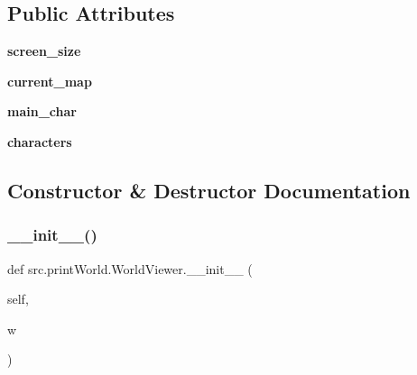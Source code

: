 \subsection*{Public Attributes}
\begin{DoxyCompactItemize}
\item 
\hypertarget{classsrc_1_1print_world_1_1_world_viewer_ae9f3c8aa9f4c6fa7266bf1938abf42d7}{}\label{classsrc_1_1print_world_1_1_world_viewer_ae9f3c8aa9f4c6fa7266bf1938abf42d7} 
{\bfseries screen\+\_\+size}
\item 
\hypertarget{classsrc_1_1print_world_1_1_world_viewer_abe280ed0dc28ea4ba79b31c8b635cce0}{}\label{classsrc_1_1print_world_1_1_world_viewer_abe280ed0dc28ea4ba79b31c8b635cce0} 
{\bfseries current\+\_\+map}
\item 
\hypertarget{classsrc_1_1print_world_1_1_world_viewer_a1fb3598723ae9082b1b0ecf97980634d}{}\label{classsrc_1_1print_world_1_1_world_viewer_a1fb3598723ae9082b1b0ecf97980634d} 
{\bfseries main\+\_\+char}
\item 
\hypertarget{classsrc_1_1print_world_1_1_world_viewer_aa32f61fefaabb55affe625facfe2697b}{}\label{classsrc_1_1print_world_1_1_world_viewer_aa32f61fefaabb55affe625facfe2697b} 
{\bfseries characters}
\end{DoxyCompactItemize}


\subsection{Constructor \& Destructor Documentation}
\hypertarget{classsrc_1_1print_world_1_1_world_viewer_a952dbc8118e5dfa003f6154426aff670}{}\label{classsrc_1_1print_world_1_1_world_viewer_a952dbc8118e5dfa003f6154426aff670} 
\subsubsection{\texorpdfstring{\+\_\+\+\_\+init\+\_\+\+\_\+()}{\_\_init\_\_()}}
{\footnotesize\ttfamily def src.\+print\+World.\+World\+Viewer.\+\_\+\+\_\+init\+\_\+\+\_\+ (\begin{DoxyParamCaption}\item[{}]{self,  }\item[{}]{w }\end{DoxyParamCaption})}

